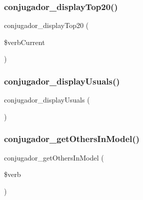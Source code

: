 \subsubsection{\texorpdfstring{conjugador\+\_\+display\+Top20()}{conjugador\_displayTop20()}}
{\footnotesize\ttfamily conjugador\+\_\+display\+Top20 (\begin{DoxyParamCaption}\item[{}]{\$verb\+Current }\end{DoxyParamCaption})}

\hypertarget{php_2conjoc__web_form_8inc_a1bfbce593ac5c763b1542fa713249aa3}{}\label{php_2conjoc__web_form_8inc_a1bfbce593ac5c763b1542fa713249aa3} 
\subsubsection{\texorpdfstring{conjugador\+\_\+display\+Usuals()}{conjugador\_displayUsuals()}}
{\footnotesize\ttfamily conjugador\+\_\+display\+Usuals (\begin{DoxyParamCaption}{ }\end{DoxyParamCaption})}

\hypertarget{php_2conjoc__web_form_8inc_a90ac7751a59eefed3b3576f1cedb016f}{}\label{php_2conjoc__web_form_8inc_a90ac7751a59eefed3b3576f1cedb016f} 
\subsubsection{\texorpdfstring{conjugador\+\_\+get\+Others\+In\+Model()}{conjugador\_getOthersInModel()}}
{\footnotesize\ttfamily conjugador\+\_\+get\+Others\+In\+Model (\begin{DoxyParamCaption}\item[{}]{\$verb }\end{DoxyParamCaption})}

\hypertarget{php_2conjoc__web_form_8inc_a9ab9dfc2c3015a0855c27f37812bb897}{}\label{php_2conjoc__web_form_8inc_a9ab9dfc2c3015a0855c27f37812bb897} 

